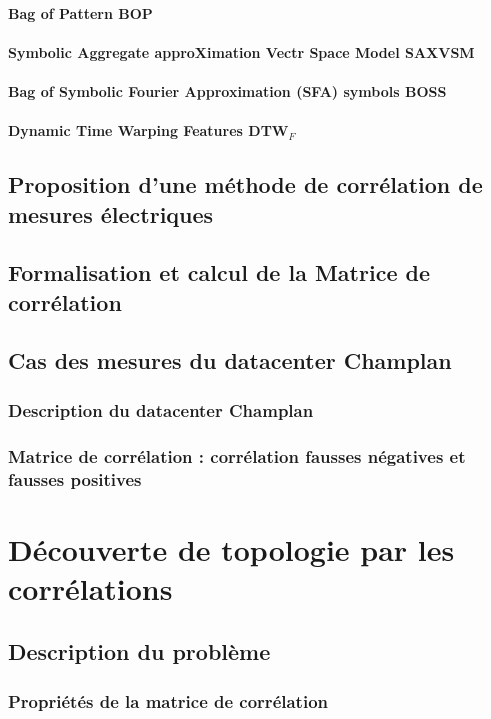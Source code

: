 \documentclass[onecolumn, 12pt]{book}
\begin{document}
			\subsubsection{Bag of Pattern BOP}
			\subsubsection{Symbolic Aggregate approXimation Vectr Space Model SAXVSM}
			\subsubsection{Bag of Symbolic Fourier Approximation (SFA) symbols BOSS}
			\subsubsection{Dynamic Time Warping Features DTW$_{F}$}
	\section{Proposition d'une m\'ethode de corr\'elation de mesures \'electriques}
	\section{Formalisation et calcul de la Matrice de corr\'elation}
	\section{Cas des mesures du datacenter Champlan}
		\subsection{Description du datacenter Champlan}
		\subsection{Matrice de corr\'elation : corr\'elation fausses n\'egatives et fausses positives}
	
\chapter{D\'ecouverte de topologie par les corr\'elations }
	\section{Description du probl\`eme }
		\subsection{Propri\'et\'es de la matrice de corr\'elation}
\end{document}
